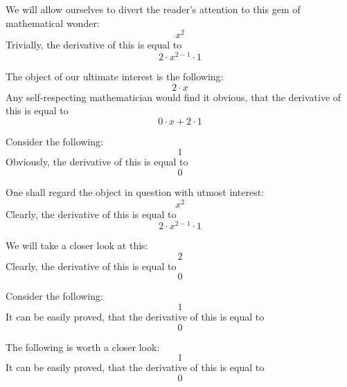 \documentclass{article}
\begin{document}
We will allow ourselves to divert the reader's attention to this gem of mathematical wonder:
\begin{equation}
x ^{2 } 
\end{equation}
Trivially, the derivative of this is equal to
\begin{equation}
2 \cdot x ^{2 - 1 } \cdot 1 
\end{equation}

The object of our ultimate interest is the following:
\begin{equation}
2 \cdot x 
\end{equation}
Any self-respecting mathematician would find it obvious, that the derivative of this is equal to
\begin{equation}
0 \cdot x + 2 \cdot 1 
\end{equation}

Consider the following:
\begin{equation}
1 
\end{equation}
Obviously, the derivative of this is equal to
\begin{equation}
0 
\end{equation}

One shall regard the object in question with utmost interest:
\begin{equation}
x ^{2 } 
\end{equation}
Clearly, the derivative of this is equal to
\begin{equation}
2 \cdot x ^{2 - 1 } \cdot 1 
\end{equation}

We will take a closer look at this:
\begin{equation}
2 
\end{equation}
Clearly, the derivative of this is equal to
\begin{equation}
0 
\end{equation}

Consider the following:
\begin{equation}
1 
\end{equation}
It can be easily proved, that the derivative of this is equal to
\begin{equation}
0 
\end{equation}

The following is worth a closer look:
\begin{equation}
1 
\end{equation}
It can be easily proved, that the derivative of this is equal to
\begin{equation}
0 
\end{equation}
\end{document}
